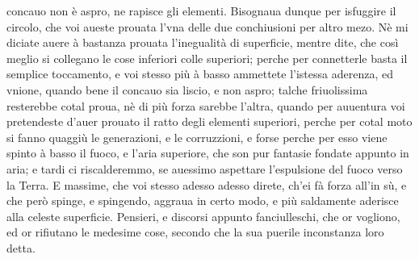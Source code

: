 \documentclass[11pt,twoside,openany]{book}
\begin{document}
concauo non è aspro, ne rapisce gli elementi. Bisognaua dunque per isfuggire il circolo, che voi aueste prouata l'vna delle due conchiusioni per altro mezo. Nè mi diciate auere à bastanza prouata l'inegualità di superficie, mentre dite, che così meglio si collegano le cose inferiori colle superiori; perche per connetterle basta il semplice toccamento, e voi stesso più à basso ammettete l'istessa aderenza, ed vnione, quando bene il concauo sia liscio, e non aspro; talche friuolissima resterebbe cotal proua, nè di più forza sarebbe l'altra, quando per auuentura voi pretendeste d'auer prouato il ratto degli elementi superiori, perche per cotal moto si fanno quaggiù le generazioni, e le corruzzioni, e forse perche per esso viene spinto à basso il fuoco, e l'aria superiore, che son pur fantasie fondate appunto in aria; e tardi ci riscalderemmo, se auessimo aspettare l'espulsione del fuoco verso la Terra. E massime, che voi stesso adesso adesso direte, ch'ei fà forza all'in sù, e che però spinge, e spingendo, aggraua in certo modo, e più saldamente aderisce alla celeste superficie. Pensieri, e discorsi appunto fanciulleschi, che or vogliono, ed or rifiutano le medesime cose, secondo che la sua puerile inconstanza loro detta.
\end{document}
